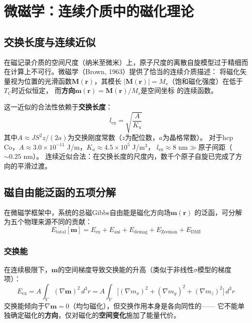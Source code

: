 \documentclass[11pt,a4paper,openany]{book}
\theoremstyle{definition}
\theoremstyle{plain}
\theoremstyle{remark}
\begin{document}
\section{微磁学：连续介质中的磁化理论}

\subsection{交换长度与连续近似}

在磁记录介质的空间尺度（纳米至微米）上，原子尺度的离散自旋模型过于精细而
在计算上不可行。微磁学（Brown, 1963）提供了恰当的连续介质描述：
将磁化矢量视为位置的光滑函数$\mathbf{M}(\mathbf{r})$，其模长
$|\mathbf{M}(\mathbf{r})| = M_s$（饱和磁化强度）在低于$T_C$时近似恒定，
而\textbf{方向}$\mathbf{m}(\mathbf{r}) = \mathbf{M}(\mathbf{r})/M_s$是空间坐标
的连续函数。

这一近似的合法性依赖于\textbf{交换长度}：
\begin{equation}
  l_{\text{ex}} = \sqrt{\frac{A}{K_u}}
\end{equation}
其中$A \approx J S^2 z / (2a)$为交换刚度常数（$z$为配位数，$a$为晶格常数）。
对于hcp Co，$A \approx 3.0 \times 10^{-11}$ J/m，$K_u \approx 4.5 \times 10^5$ J/m$^3$，
$l_{\text{ex}} \approx 8$ nm$\gg$原子间距（$\sim 0.25$ nm）。
连续近似合法：在交换长度的尺度内，数千个原子自旋已完成了方向的平滑过渡。

\subsection{磁自由能泛函的五项分解}

在微磁学框架中，系统的总磁Gibbs自由能是磁化方向场$\mathbf{m}(\mathbf{r})$
的泛函，可分解为五个物理来源不同的贡献：
\begin{equation}\label{eq:free-energy}
  E_{\text{total}}[\mathbf{m}]
  = E_{\text{ex}} + E_{\text{ani}} + E_{\text{demag}} + E_{\text{Zeeman}} + E_{\text{DMI}}
\end{equation}

\subsubsection{交换能}

在连续极限下，$\mathbf{m}$的空间梯度导致交换能的升高（类似于非线性$\sigma$模型的梯度项）：
\begin{equation}\label{eq:exchange}
  E_{\text{ex}} = A\int_V (\nabla\mathbf{m})^2\,d^3r
  = A\int_V \bigl[ (\nabla m_x)^2 + (\nabla m_y)^2 + (\nabla m_z)^2 \bigr]\,d^3r
\end{equation}
交换能倾向于$\nabla\mathbf{m} = 0$（均匀磁化），但交换作用本身是各向同性的——
它不能单独确定磁化的\textbf{方向}，仅对磁化的\textbf{空间变化}施加了能量代价。
\end{document}
